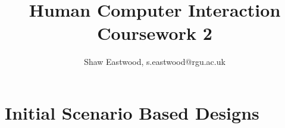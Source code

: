 \documentclass{article}
\title{Human Computer Interaction \\ Coursework 2}
\author{Shaw Eastwood, s.eastwood@rgu.ac.uk}
\begin{document}
	\maketitle

	\section{Initial Scenario Based Designs}

	
	
	
\end{document}

